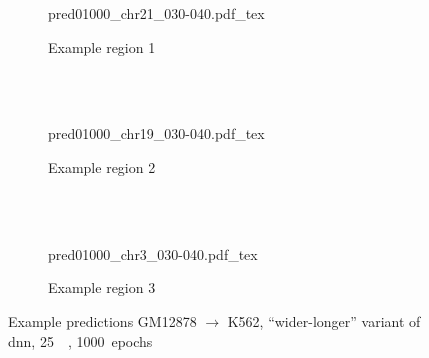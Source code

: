 \begin{figure}[p]
    \begin{subfigure}{\textwidth}
        \centering
        \scriptsize
        {pred01000_chr21_030-040.pdf_tex}
        \caption{Example  region 1} \label{fig:results:wider-longer_r1}
    \end{subfigure}\\[2mm]
    \\[3mm]
    \begin{subfigure}{\textwidth}
        \centering
        \scriptsize
        {pred01000_chr19_030-040.pdf_tex}
        \caption{Example region 2} \label{fig:results:wider-longer_r2}
    \end{subfigure}\\[2mm]
    \\[3mm]
    \begin{subfigure}{\textwidth}
        \centering
        \scriptsize
        {pred01000_chr3_030-040.pdf_tex}
        \caption{Example region 3} \label{fig:results:wider-longer_r3}
    \end{subfigure}
    \caption{Example predictions GM12878 $\rightarrow$ K562, ``wider-longer'' variant of \acrshort{dnn}, \SI{25}{\kilo\bp}, 1000~epochs} \label{fig:results:wider-longer_matrices}
\end{figure}

